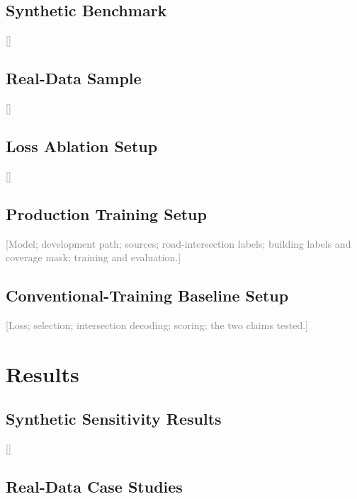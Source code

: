 \documentclass[sigconf]{acmart}
\newcommand{\tbd}[1]{\textcolor{gray}{[#1]}}
\begin{document}
\subsection{Synthetic Benchmark}
\label{subsec:synthetic-setup}
\tbd{}

\subsection{Real-Data Sample}
\label{subsec:realdata-setup}
\tbd{}

\subsection{Loss Ablation Setup}
\label{subsec:lossablation-setup}
\tbd{}

\subsection{Production Training Setup}
\label{subsec:scaled-setup}
\tbd{Model; development path; sources; road-intersection labels; building labels and coverage mask; training and
evaluation.}

\subsection{Conventional-Training Baseline Setup}
\label{subsec:baseline-setup}
\tbd{Loss; selection; intersection decoding; scoring; the two claims tested.}

\section{Results}
\label{sec:results}

\subsection{Synthetic Sensitivity Results}
\label{subsec:synthetic-results}
\tbd{}

\subsection{Real-Data Case Studies}
\label{subsec:realdata-results}

\begin{table}
  \caption{Road breakage on 50 real SpaceNet tiles.}
  \label{tab:realdata-breakage}
\end{table}
\end{document}
